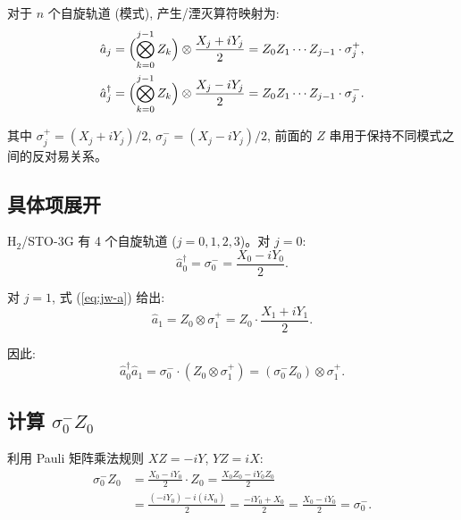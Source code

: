 \documentclass[fontset=mac]{ctexart}
\newcommand{\adag}[1]{\hat{a}_{#1}^\dagger}
\newcommand{\aop}[1]{\hat{a}_{#1}}
\newcommand{\Xop}{X}
\newcommand{\Yop}{Y}
\newcommand{\Zop}{Z}
\begin{document}
对于 $n$ 个自旋轨道 (模式), 产生/湮灭算符映射为:
\begin{align}
    \aop{j}   &= \Bigl(\bigotimes_{k=0}^{j-1} \Zop_k\Bigr) \otimes
                 \frac{\Xop_j + i\Yop_j}{2}
                 = Z_0 Z_1 \cdots Z_{j-1} \cdot \sigma_j^+, \label{eq:jw-a} \\
    \adag{j}  &= \Bigl(\bigotimes_{k=0}^{j-1} \Zop_k\Bigr) \otimes
                 \frac{\Xop_j - i\Yop_j}{2}
                 = Z_0 Z_1 \cdots Z_{j-1} \cdot \sigma_j^-. \label{eq:jw-adag}
\end{align}

其中 $\sigma_j^+ = (\Xop_j + i\Yop_j)/2$, $\sigma_j^- = (\Xop_j - i\Yop_j)/2$,
前面的 $Z$ 串用于保持不同模式之间的反对易关系。

\subsection*{具体项展开}

H$_2$/STO-3G 有 4 个自旋轨道 ($j=0,1,2,3$)。对 $j=0$:
\begin{equation}
    \adag{0} = \sigma_0^- = \frac{\Xop_0 - i\Yop_0}{2}.
\end{equation}

对 $j=1$, 式 (\ref{eq:jw-a}) 给出:
\begin{equation}
    \aop{1} = \Zop_0 \otimes \sigma_1^+ = \Zop_0 \cdot \frac{\Xop_1 + i\Yop_1}{2}.
\end{equation}

因此:
\begin{equation}
    \adag{0} \aop{1} = \sigma_0^- \cdot (\Zop_0 \otimes \sigma_1^+)
                      = (\sigma_0^- \Zop_0) \otimes \sigma_1^+.
\end{equation}

\subsection*{计算 $\sigma_0^- \Zop_0$}

利用 Pauli 矩阵乘法规则 $XZ = -iY$, $YZ = iX$:
\begin{align}
    \sigma_0^- \Zop_0 &= \frac{\Xop_0 - i\Yop_0}{2} \cdot \Zop_0
                       = \frac{\Xop_0 \Zop_0 - i\Yop_0 \Zop_0}{2} \nonumber \\
                       &= \frac{(-i\Yop_0) - i(i\Xop_0)}{2}
                       = \frac{-i\Yop_0 + \Xop_0}{2}
                       = \frac{\Xop_0 - i\Yop_0}{2} = \sigma_0^-.
\end{align}
\end{document}
